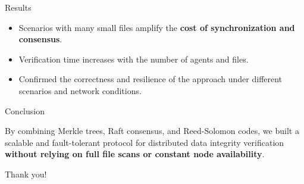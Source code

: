 \begin{frame}{Results}
\begin{itemize}
\item Scenarios with many small files amplify the \textbf{cost of synchronization and consensus}.
\item Verification time increases with the number of agents and files.
\item Confirmed the correctness and resilience of the approach under different scenarios and network conditions.
\end{itemize}
\end{frame}

\begin{frame}{Conclusion}

By combining Merkle trees, Raft consensus, and Reed-Solomon codes, we built a scalable and fault-tolerant protocol for distributed data integrity verification \textbf{without relying on full file scans or constant node availability}.

\vspace{2cm}
\centering
Thank you!
\end{frame}

